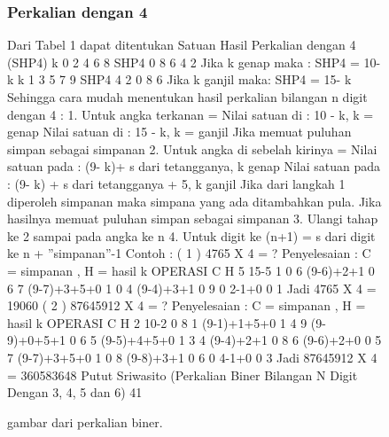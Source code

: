 \begin{figure}[ht]
	\centerline{}
	\caption{gambar dari perkalian biner.}
	\label{perkalian}

\subsubsection {Perkalian dengan 4}
Dari Tabel 1 dapat  ditentukan
Satuan Hasil Perkalian dengan 4 (SHP4)
k 0 2 4 6 8
SHP4 0 8 6 4 2
Jika k genap maka :
SHP4 = 10- k
k 1 3 5 7 9
SHP4 4 2 0 8 6
Jika k ganjil maka:
SHP4 = 15- k
Sehingga cara mudah menentukan hasil
perkalian bilangan n digit dengan 4 :
1. Untuk angka terkanan =
Nilai satuan di : 10 - k, k = genap
Nilai satuan di : 15 - k, k = ganjil
Jika memuat puluhan simpan sebagai
simpanan
2. Untuk angka di sebelah kirinya =
Nilai satuan pada : (9- k)+ s dari
tetangganya, k genap
Nilai satuan pada : (9- k) + s dari
tetangganya + 5, k ganjil
Jika dari langkah 1 diperoleh
simpanan maka simpana yang ada
ditambahkan pula.
Jika hasilnya memuat puluhan simpan
sebagai simpanan
3. Ulangi tahap ke 2 sampai pada angka ke n
4. Untuk digit ke (n+1) =
 s dari digit ke n + ”simpanan”-1
Contoh :
( 1 ) 4765 X 4 = ?
Penyelesaian :
C = simpanan , H = hasil
k OPERASI C H
5 15-5 1 0
6 (9-6)+2+1 0 6
7 (9-7)+3+5+0 1 0
4 (9-4)+3+1 0 9
0 2-1+0 0 1
Jadi 4765 X 4 = 19060
( 2 ) 87645912 X 4 = ?
Penyelesaian :
C = simpanan , H = hasil
k OPERASI C H
2 10-2 0 8
1 (9-1)+1+5+0 1 4
9 (9-9)+0+5+1 0 6
5 (9-5)+4+5+0 1 3
4 (9-4)+2+1 0 8
6 (9-6)+2+0 0 5
7 (9-7)+3+5+0 1 0
8 (9-8)+3+1 0 6
0 4-1+0 0 3
Jadi 87645912 X 4 = 360583648
Putut Sriwasito (Perkalian Biner Bilangan N Digit Dengan 3, 4, 5 dan 6)
41

\end{figure}

